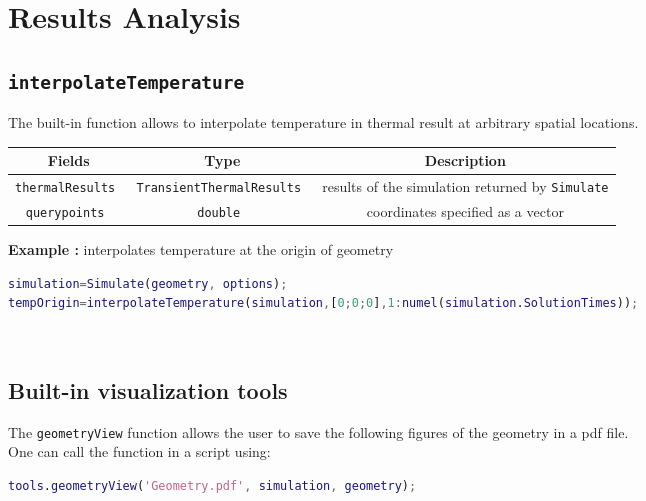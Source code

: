 \section{Results Analysis}

\subsection{\tt interpolateTemperature}

The built-in function allows to interpolate temperature in thermal result at arbitrary spatial locations. \\

\renewcommand{\arraystretch}{1.5}
\begin{table}[h]
    \centering
    \begin{tabular}{|>{\customfont}c|>{\customfont}c|>{\customfont}c|}
        \hline 
        \rowcolor{gray!30}
        \textbf{Fields} & \textbf{Type} & \textbf{Description} \\ \hline
        \tt thermalResults & \tt TransientThermalResults & results of the simulation returned by \texttt{Simulate} \\ \hline 
        \tt querypoints & \tt double & coordinates specified as a vector \\ \hline 
    \end{tabular}
\end{table}



\textbf{Example :} interpolates temperature at the origin of geometry

\begin{lstlisting}[language=Matlab]
simulation=Simulate(geometry, options);
tempOrigin=interpolateTemperature(simulation,[0;0;0],1:numel(simulation.SolutionTimes));
\end{lstlisting}
\ 


\subsection{Built-in visualization tools} 

The {\tt geometryView} function allows the user to save the following figures of the geometry in a pdf file.\\
One can call the function in a script using: 

\begin{lstlisting}[language=Matlab]
tools.geometryView('Geometry.pdf', simulation, geometry);
\end{lstlisting}

